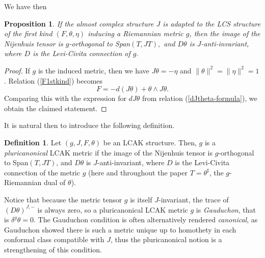 \documentclass[a4paper,11pt]{amsart}
\newtheorem{prop}[thm]{Proposition}
\theoremstyle{definition}
\newtheorem{defn}[thm]{Definition}
\renewcommand{\[}{\begin{equation*}}
\renewcommand{\]}{\end{equation*}}
\begin{document}
We have then
\begin{prop}\label{first-kind-characterization}
If the almost complex structure $J$ is adapted to the LCS structure of the first kind $(F, \theta,\eta)$ inducing a Riemannian metric $g$, then the image of the Nijenhuis tensor is $g$-orthogonal to Span$(T,JT),$ and $D \theta$ is $J$-anti-invariant, where $D$ is the Levi-Civita connection of $g.$
\end{prop}

\begin{proof} If $g$ is the induced metric, then we have
$J\theta = -\eta$ and $\|\theta\|^2=\|\eta\|^2 = 1$. Relation (\ref{F1stkind}) becomes
$$ F = -d(J\theta) + \theta \wedge J\theta.$$
Comparing this with the expression for $dJ\theta$ from relation (\ref{dJtheta-formula}), we obtain the claimed statement. 
\end{proof}

It is natural then to introduce the following definition.
\begin{defn}\label{definition-pluricanonical}
  Let $(g, J, F, \theta)$ be an LCAK structure.
  Then, $g$ is a {\it pluricanonical} LCAK metric if the image of the Nijenhuis tensor is $g$-orthogonal to Span$(T,JT)$, and $D\theta$ is $J$-anti-invariant, where $D$ is the Levi-Civita connection of the metric $g$ (here and throughout the paper $T=\theta^\sharp$, the $g$-Riemannian dual of $\theta$). 
  \end{defn}
Notice that because the metric tensor $g$ is itself $J$-invariant, the trace of $(D\theta)^{J,-}$ is always zero, so a pluricanonical LCAK metric $g$ is {\it Gauduchon}, that is $\delta^g\theta=0.$ The Gauduchon condition is often alternatively rendered \emph{canonical}, as Gauduchon \cite{MR470920} showed there is such a metric unique up to homothety in each conformal class compatible with $J$, thus the pluricanonical notion is a strengthening of this condition.
\end{document}
